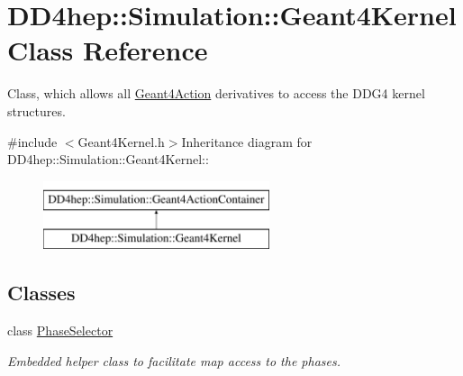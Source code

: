 \hypertarget{class_d_d4hep_1_1_simulation_1_1_geant4_kernel}{
\section{DD4hep::Simulation::Geant4Kernel Class Reference}
\label{class_d_d4hep_1_1_simulation_1_1_geant4_kernel}
}


Class, which allows all \hyperlink{class_d_d4hep_1_1_simulation_1_1_geant4_action}{Geant4Action} derivatives to access the DDG4 kernel structures.  


{\ttfamily \#include $<$Geant4Kernel.h$>$}Inheritance diagram for DD4hep::Simulation::Geant4Kernel::\begin{figure}[H]
\begin{center}
\leavevmode
\includegraphics[height=2cm]{class_d_d4hep_1_1_simulation_1_1_geant4_kernel}
\end{center}
\end{figure}
\subsection*{Classes}
\begin{DoxyCompactItemize}
\item 
class \hyperlink{class_d_d4hep_1_1_simulation_1_1_geant4_kernel_1_1_phase_selector}{PhaseSelector}
\begin{DoxyCompactList}\small\item\em Embedded helper class to facilitate map access to the phases. \item\end{DoxyCompactList}\end{DoxyCompactItemize}
